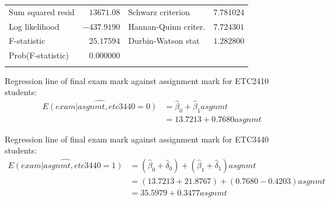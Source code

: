 \documentclass[12pt]{report}
\begin{document}
\begin{table}[H]
\begin{tabular}{lrrrr}
		\multicolumn{1}{l}{Sum squared resid}&\multicolumn{1}{r}{$13671.08$}&\multicolumn{2}{l}{Schwarz criterion}&\multicolumn{1}{r}{$7.781024$}\\
		\multicolumn{1}{l}{Log likelihood}&\multicolumn{1}{r}{$-437.9190$}&\multicolumn{2}{l}{Hannan-Quinn criter.}&\multicolumn{1}{r}{$7.724301$}\\
		\multicolumn{1}{l}{F-statistic}&\multicolumn{1}{r}{$25.17594$}&\multicolumn{2}{l}{Durbin-Watson stat}&\multicolumn{1}{r}{$1.282800$}\\
		\multicolumn{1}{l}{Prob(F-statistic)}&\multicolumn{1}{r}{$0.000000$}&\multicolumn{1}{c}{}&\multicolumn{1}{c}{}&\multicolumn{1}{c}{}\\
		[4.5pt] \hline \\ [-4.5pt]
	\end{tabular}
\end{table}

\vspace{-\baselineskip}
\noindent Regression line of final exam mark against assignment mark for ETC2410 students:
\begin{align*}
	\widehat{E(exam|asgnmt,etc3440=0)} &= \hat{\beta}_0 + \hat{\beta}_1asgnmt \\
	&= 13.7213 + 0.7680asgnmt 
\end{align*}


\noindent Regression line of final exam mark against assignment mark for ETC3440 students:
\begin{align*}
\widehat{E(exam|asgnmt,etc3440=1)} &= (\hat{\beta}_0 + \hat{\delta}_0) + (\hat{\beta}_1 + \hat{\delta}_1)asgnmt \\
&= (13.7213+21.8767) + (0.7680-0.4203)asgnmt \\
&= 35.5979+0.3477asgnmt
\end{align*}
\end{document}

